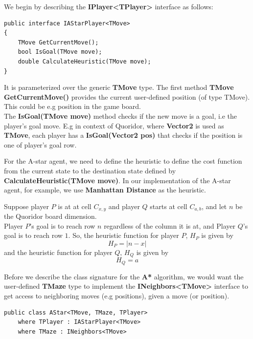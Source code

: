 We begin by describing the \textbf{IPlayer\textless{}TPlayer\textgreater{}} interface as follows:
\begin{lstlisting}
public interface IAStarPlayer<TMove>
{
    TMove GetCurrentMove();
    bool IsGoal(TMove move);
    double CalculateHeuristic(TMove move);
}
\end{lstlisting}

It is parameterized over the generic \textbf{TMove} type. The first method \textbf{TMove GetCurrentMove()} provides the current user-defined position (of type TMove). This could be e.g position in the game board.\\
The \textbf{IsGoal(TMove move)} method checks if the new move is a goal, i.e the player's goal move. E.g in context of Quoridor, where \textbf{Vector2} is used as \textbf{TMove}, each player has a \textbf{IsGoal(Vector2 pos)} that checks if the position is one of player's goal row.

For the A-star agent, we need to define the heuristic to define the cost function from the current state to the destination state defined by \textbf{CalculateHeuristic(TMove move)}. In our implementation of the A-star agent, for example, we use \textbf{Manhattan Distance} as the heuristic.

Suppose player $P$ is at at cell $C_{x,y}$ and player $Q$ starts at cell $C_{a,b}$, and let $n$ be the Quoridor board dimension.\\
Player $P$'s goal is to reach row $n$ regardless of the column it is at, and Player $Q$'s goal is to reach row $1$.
So, the heuristic function for player $P$, $H_P$ is given by
\begin{equation}
\label{eq:playerPHeuristic}
    H_P = | n - x |
\label{eq:playerPHeuristic}
\end{equation}
and the heuristic function for player $Q$, $H_Q$ is given by
\begin{equation}
\label{eq:playerQHeuristic}
    H_Q = a
\end{equation}

Before we describe the class signature for the \textbf{A*} algorithm, we would want the user-defined \textbf{TMaze} type to implement the \textbf{INeighbors\textless{}TMove\textgreater{}} interface to get access to neighboring moves (e.g positions), given a move (or position).

\begin{lstlisting}
public class AStar<TMove, TMaze, TPlayer>
    where TPlayer : IAStarPlayer<TMove>
    where TMaze : INeighbors<TMove>
\end{lstlisting}

